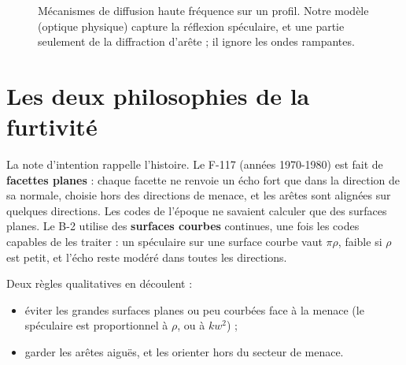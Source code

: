 \begin{figure}[htbp]
\centering
{}
\caption{Mécanismes de diffusion haute fréquence sur un profil. Notre modèle (optique physique) capture la réflexion spéculaire, et une partie seulement de la diffraction d'arête ; il ignore les ondes rampantes.}\label{fig:mecanismes}
\end{figure}

\section{Les deux philosophies de la furtivité}
La note d'intention rappelle l'histoire. Le F-117 (années 1970-1980) est fait de \textbf{facettes planes} : chaque facette ne renvoie un écho fort que dans la direction de sa normale, choisie hors des directions de menace, et les arêtes sont alignées sur quelques directions. Les codes de l'époque ne savaient calculer que des surfaces planes. Le B-2 utilise des \textbf{surfaces courbes} continues, une fois les codes capables de les traiter : un spéculaire sur une surface courbe vaut $\pi\rho$, faible si $\rho$ est petit, et l'écho reste modéré dans toutes les directions.

Deux règles qualitatives en découlent :
\begin{itemize}
\item éviter les grandes surfaces planes ou peu courbées face à la menace (le spéculaire est proportionnel à $\rho$, ou à $kw^2$) ;
\item garder les arêtes aiguës, et les orienter hors du secteur de menace.
\end{itemize}

